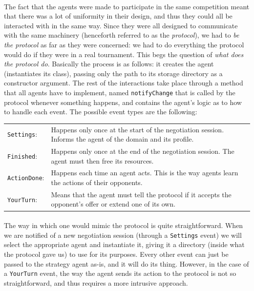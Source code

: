 \documentclass[12pt]{article}
\numberwithin{equation}{section}
\begin{document}
			\paragraph*{}
				The fact that the agents were made to participate in the same competition meant that there was a lot of uniformity in their design, and thus they could all be interacted with in the same way. Since they were all designed to communicate with the same machinery (henceforth referred to as the \emph{protocol}), we had to \emph{be the protocol} as far as they were concerned: we had to do everything the protocol would do if they were in a real tournament. %
				This begs the question of \emph{what does the protocol do}. Basically the process is as follows: it creates the agent (instantiates its class), passing only the path to its storage directory as a constructor argument. The rest of the interactions take place through a method that all agents have to implement, named \texttt{notifyChange} that is called by the protocol whenever something happens, and contains the agent's logic as to how to handle each event. The possible event types are the following:
				\renewcommand{\arraystretch}{1.5} %
				\begin{longtable}{l p{290pt}}

					\texttt{Settings}: & Happens only once at the start of the negotiation session. Informs the agent of the domain and its profile. \\

					\texttt{Finished}: & Happens only once at the end of the negotiation session. The agent must then free its resources. \\
					
					\texttt{ActionDone}: & Happens each time an agent acts. This is the way agents learn the actions of their opponents. \\
					
					\texttt{YourTurn}:	& Means that the agent must tell the protocol if it accepts the opponent's offer or extend one of its own. \\

				\end{longtable}
			
			\paragraph*{}
				The way in which one would mimic the protocol is quite straightforward. When we are notified of a new negotiation session (through a \texttt{Settings} event) we will select the appropriate agent and instantiate it, giving it a directory (inside what the protocol gave us) to use for its purposes. Every other event can just be passed to the strategy agent %
				as-is, and it will do its thing. However, in the case of a \texttt{YourTurn} event, the way the agent sends its action to the protocol is not so straightforward, and thus requires a more intrusive approach. %
\end{document}
